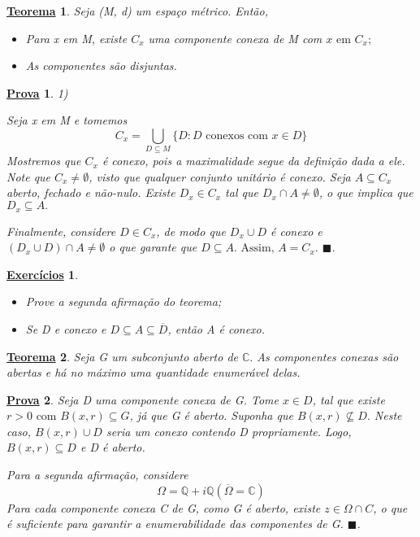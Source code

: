 \documentclass{article}
\newtheorem*{theorem*}{\underline{Teorema}}
\newtheorem*{proof*}{\underline{Prova}}
\newtheorem*{exer*}{\underline{Exerc\'icios}}
\renewcommand\qedsymbol{$\blacksquare$}
\begin{document}
  \begin{theorem*}
    Seja (M, d) um espa\c co m\'etrico. Ent\~ao,
    \begin{itemize}
      \item[1)] Para x em M, existe $C _{x}$ uma componente conexa de M com $x\text{ em }C _{x}; $
      \item[2)] As componentes s\~ao disjuntas.
    \end{itemize}
  \end{theorem*}
  \begin{proof*}
    1) \par Seja x em M e tomemos
    $$
    C _{x} = \bigcup _{D\subseteq{M}} \{D: D \text{ conexos com } x\in{D}\}
    $$
    Mostremos que $C _{x}$ \'e conexo, pois a maximalidade segue da defini\c c\~ao dada a ele. Note que $C _{x}\neq\emptyset$, visto que
    qualquer conjunto unit\'ario \'e conexo. Seja $A\subseteq{C _{x}}$ aberto, fechado e n\~ao-nulo. Existe $D _{x}\in C _{x}$ tal
    que $D _{x}\cap{A}\neq\emptyset$, o que implica que $D _{x}\subseteq{A}.$

    Finalmente, considere $D\in C _{x}$, de modo que $D _{x}\cup{D}$ \'e conexo e $(D _{x}\cup{D})\cap{A}\neq\emptyset$ o que garante
    que $D\subseteq{A}. \text{ Assim, } A = C _{x}.$
    \qedsymbol.
  \end{proof*}
  \begin{exer*}
    \begin{itemize}
      \item[1)] Prove a segunda afirma\c c\~ao do teorema;
      \item[2)] Se D e conexo e $D\subseteq{A}\subseteq{\overline{D}}$, ent\~ao A \'e conexo.
    \end{itemize}
  \end{exer*}

  \begin{theorem*}
    Seja G um subconjunto aberto de $\mathbb{C}.$ As componentes conexas s\~ao abertas e h\'a no m\'aximo uma quantidade enumer\'avel
    delas.
  \end{theorem*}
  \begin{proof*}
    Seja D uma componente conexa de G. Tome $x\in{D}$, tal que existe $r > 0 \text{ com } B(x, r)\subseteq{G}$, j\'a que G \'e aberto.
    Suponha que $B(x, r)\not\subseteq{D}.$ Neste caso, $B(x, r)\cup{D}$ seria um conexo contendo D propriamente. Logo, 
    $B(x, r)\subseteq{D}$ e D \'e aberto. 

    Para a segunda afirma\c c\~ao, considere 
    $$
    \Omega = \mathbb{Q} + i\mathbb{Q} (\overline{\Omega} = \mathbb{C})
    $$  
    Para cada componente conexa C de G, como G \'e aberto, existe $z\in{\Omega\cap{C}}$, o que \'e suficiente para garantir a enumerabilidade
    das componentes de G.
    \qedsymbol.
  \end{proof*}
\end{document}
